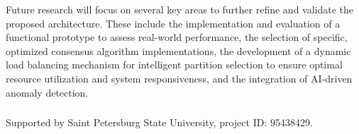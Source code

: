 \documentclass[10pt]{llncs}
\begin{document}
Future research will focus on several key areas to further refine and validate the proposed architecture. 
These include the implementation and evaluation of a functional prototype to assess real-world performance, the selection of specific, optimized consensus algorithm implementations, 
the development of a dynamic load balancing mechanism for intelligent partition selection to ensure optimal resource utilization and system responsiveness, and the integration of AI-driven anomaly detection.

\begin{credits}
    \subsubsection{\ackname} Supported by Saint Petersburg State University, project ID: 95438429.
\end{credits}


\end{document}

